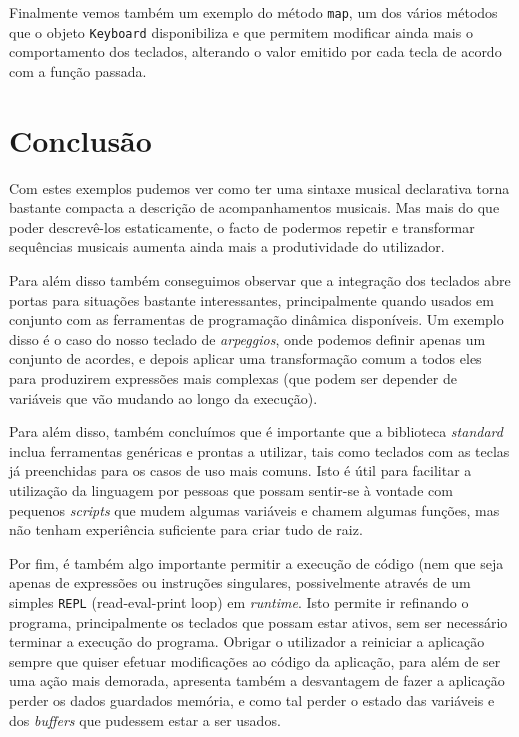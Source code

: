 Finalmente vemos também um exemplo do método \texttt{map}, um dos vários métodos que o objeto \texttt{Keyboard} disponibiliza e que permitem modificar ainda mais o comportamento dos teclados, alterando o valor emitido por cada tecla de acordo com a função passada.

\needspace{.2\textheight}

\section{Conclusão}
Com estes exemplos pudemos ver como ter uma sintaxe musical declarativa torna bastante compacta a descrição de acompanhamentos musicais. Mas mais do que poder descrevê-los estaticamente, o facto de podermos repetir e transformar sequências musicais aumenta ainda mais a produtividade do utilizador.

Para além disso também conseguimos observar que a integração dos teclados abre portas para situações bastante interessantes, principalmente quando usados em conjunto com as ferramentas de programação dinâmica disponíveis. Um exemplo disso é o caso do nosso teclado de \textit{arpeggios}, onde podemos definir apenas um conjunto de acordes, e depois aplicar uma transformação comum a todos eles para produzirem expressões mais complexas (que podem ser depender de variáveis que vão mudando ao longo da execução).

Para além disso, também concluímos que é importante que a biblioteca \textit{standard} inclua ferramentas genéricas e prontas a utilizar, tais como teclados com as teclas já preenchidas para os casos de uso mais comuns. Isto é útil para facilitar a utilização da linguagem por pessoas que possam sentir-se à vontade com pequenos \textit{scripts} que mudem algumas variáveis e chamem algumas funções, mas não tenham experiência suficiente para criar tudo de raiz.

Por fim, é também algo importante permitir a execução de código (nem que seja apenas de expressões ou instruções singulares, possivelmente através de um simples \texttt{REPL} (read-eval-print loop) em \textit{runtime}. Isto permite ir refinando o programa, principalmente os teclados que possam estar ativos, sem ser necessário terminar a execução do programa. Obrigar o utilizador a reiniciar a aplicação sempre que quiser efetuar modificações ao código da aplicação, para além de ser uma ação mais demorada, apresenta também a desvantagem de fazer a aplicação perder os dados guardados memória, e como tal perder o estado das variáveis e dos \textit{buffers} que pudessem estar a ser usados.
